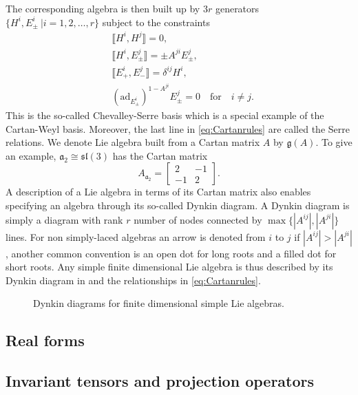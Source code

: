 The corresponding algebra is then built up by $3r$ generators $\{H^i,E_{\pm}^i\ |i=1,2,\ldots,r\}$ subject to the constraints
\begin{equation}
\begin{aligned}\label{eq:Cartanrules}
    &\llbracket H^i,H^j\rrbracket = 0,\\
    &\llbracket H^i,E_{\pm}^j\rrbracket = \pm A^{ji}E_{\pm}^{j},\\
    &\llbracket E_+^i,E_-^j\rrbracket = \delta^{ij}H^i,\\
    &(\text{ad}_{E_{\pm}^i})^{1-A^{ji}}E^j_\pm = 0 \quad \text{for} \quad i\neq j.
\end{aligned}
\end{equation}
This is the so-called Chevalley-Serre basis which is a special example of the Cartan-Weyl basis. Moreover, the last line in \eqref{eq:Cartanrules} are called the Serre relations. We denote Lie algebra built from a Cartan matrix $A$ by $\mathfrak{g}(A)$. To give an example, $\mathfrak{a}_2\cong \mathfrak{sl}(3)$ has the Cartan matrix
\begin{equation}
    A_\mathfrak{a_2}=\begin{bmatrix}2&-1\\-1&2\end{bmatrix}.
\end{equation}
A description of a Lie algebra in terms of its Cartan matrix also enables specifying an algebra through its so-called Dynkin diagram. A Dynkin diagram is simply a diagram with rank $r$ number of nodes connected by $\max\{|A^{ij}|,|A^{ji}|\}$ lines. For non simply-laced algebras an arrow is denoted from $i$ to $j$ if $|A^{ij}|>|A^{ji}|$, another common convention is an open dot for long roots and a filled dot for short roots. Any simple finite dimensional Lie algebra is thus described by its Dynkin diagram in  and the relationships in \eqref{eq:Cartanrules}.
\begin{figure}
    \centering
    \AllDynkin
    \caption{Dynkin diagrams for finite dimensional simple Lie algebras.}
    \label{fig:AllDynkin}
\end{figure}




\subsection{Real forms}
\subsection{Invariant tensors and projection operators}

